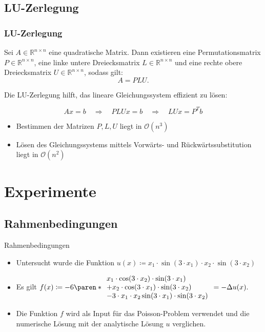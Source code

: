 \documentclass[9pt, t]{beamer}
\newcommand\R{\mathbb{R}}
\begin{document}
\subsection{LU-Zerlegung}
\begin{frame}
\frametitle{LU-Zerlegung}

Sei \(A \in \mathbb{R}^{n \times n}\) eine quadratische Matrix. Dann existieren eine
Permutationsmatrix \(P \in \R^{n \times n}\), eine linke untere Dreiecksmatrix
\(L \in \mathbb{R}^{n \times n}\) und eine rechte obere Dreiecksmatrix \(U \in \mathbb{R}^{n
\times n}\), sodass gilt:
\[
    A = PLU.
\]

Die LU-Zerlegung  hilft, das lineare Gleichungssystem effizient zu lösen:

\[
    A x = b \quad \Rightarrow \quad PLU x = b \quad \Rightarrow \quad LU x = P^T b
\]
\begin{itemize}
    \item Bestimmen der Matrizen \(P, L, U\) liegt in \(\mathcal{O}(n^3)\)
    \item Lösen des Gleichungssystems mittels Vorwärts- und Rückwärtssubstitution liegt in \(\mathcal{O}(n^2)\)
\end{itemize}
\end{frame}



\section{Experimente}
\subsection{Rahmenbedingungen}
\begin{frame}{Rahmenbedingungen}
    \begin{itemize}
        \item Untersucht wurde die Funktion \(u(x) \coloneq x_1 \cdot \sin(3 \cdot x_1) \cdot x_2 \cdot \sin(3 \cdot x_2)\)
        \item Es gilt \(f(x) \coloneq -6 \paren*{\begin{array}{l}
            x_1 \cdot \cos(3 \cdot x_2) \cdot \sin(3 \cdot x_1)   \\
            + x_2 \cdot \cos(3 \cdot x_1) \cdot \sin(3 \cdot x_2) \\
            - 3 \cdot x_1 \cdot x_2 \sin(3 \cdot x_1) \cdot \sin(3 \cdot x_2)
        \end{array}}
    = -\Delta u(x). \)
        \item Die Funktion \(f\) wird als Input für das Poisson-Problem verwendet
        und die numerische Lösung mit der analytische Lösung \(u\) verglichen.
    \end{itemize}
    
\end{frame}
\end{document}
